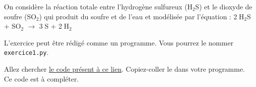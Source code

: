 \documentclass[11pt]{article}
\begin{document}



\bigskip


On considère la réaction totale entre l’hydrogène sulfureux (H$_2$S) et le dioxyde de soufre (SO$_2$) qui  produit du soufre et de l’eau et modélisée par l'équation : 
2$\;$H$_2$S  + SO$_2$ $\longrightarrow$ 3$\;$S + 2$\;$H$_2$


\medskip
L'exercice peut être rédigé comme un programme. Vous pourrez le nommer \texttt{exercice1.py}. 

\medskip

Allez chercher \href{https://github.com/formationPythonPC-Juin/aides-formation/blob/master/exercice1-aide.py}{\underline{le code présent à ce lien}}. Copiez-coller le dans votre programme. Ce code est à compléter.
\end{document}
